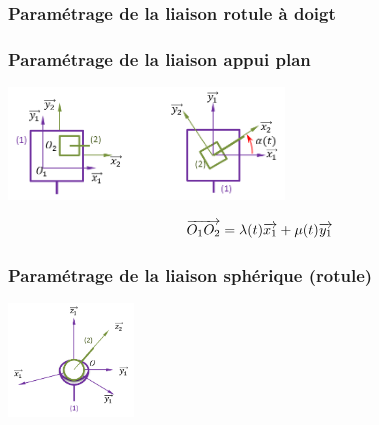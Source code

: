 \documentclass[10pt,oneside]{article}
\begin{document}
\subsubsection{Paramétrage de la liaison rotule à doigt}
\begin{minipage}[c]{.3\linewidth}
\begin{center}
\end{center}
\end{minipage} \hfill
\begin{minipage}[c]{.65\linewidth}

\end{minipage}

\subsubsection{Paramétrage de la liaison appui plan}
\begin{minipage}[c]{.3\linewidth}
\begin{center}
\includegraphics[height=3cm]{png/plan_p}
\end{center}
\end{minipage} \hfill
\begin{minipage}[c]{.65\linewidth}
$$
\overrightarrow{O_1 O_2} = \lambda(t) \overrightarrow{x_1} + \mu(t) \overrightarrow{y_1}
$$
\end{minipage}

\subsubsection{Paramétrage de la liaison sphérique (rotule)}
\begin{minipage}[c]{.3\linewidth}
\begin{center}
\includegraphics[height=3cm]{png/rotule_3d}
\end{center}
\end{minipage} \hfill
\begin{minipage}[c]{.65\linewidth}

\end{minipage}
\end{document}
